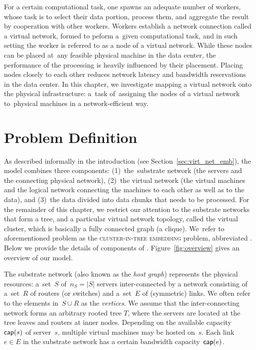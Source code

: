 
For a certain computational task, one spawns an adequate number of workers, whose task is to select their data portion, process them, and aggregate the result by cooperation with other workers.
Workers establish a network connection called a virtual network, formed to peform a~given computational task, and in such setting the worker is referred to as a node of a virtual network.
While these nodes can be placed at~any feasible physical machine in the data center, the performance of the processing is heavily influenced by their placement.
Placing nodes closely to each other reduces network latency and bandwidth reservations in the data center.
In this chapter, we investigate mapping a virtual network onto the physical infrastructure: a~task of~assigning the nodes of a virtual network to~physical machines in a network-efficient way.

\section{Problem Definition}\label{sec:model}

As described informally in the introduction (see Section~\ref{sec:virt_net_emb}), the model combines three components: (1)~the~substrate network (the servers
and the connecting physical network),
(2)~the virtual network (the virtual machines and the logical network connecting the machines to each other
as well as to the data), and (3)~the data divided into data chunks that needs to be processed.
For the remainder of this chapter, we restrict our attention to the substrate networks that form a tree, and a particular virtual network topology, called the virtual cluster, which is basically a fully connected graph (a clique).
We~refer to aforementioned problem as the \textsc{cluster-in-tree embedding} problem, abbreviated \CTE.
Below we provide the details of components of \CTE. Figure~\ref{fig:overview} gives an overview of our model.


 The substrate network (also known as the \emph{host graph}) represents the physical resources:
a~set~$S$ of~$n_S=|S|$ servers inter-connected by a network consisting of a~set~$R$ of routers (or switches)
and a~set~$E$ of (symmetric) links. We often refer to the elements in~$S\cup R$
as the \emph{vertices}. We assume that the inter-connecting network forms an arbitrary rooted tree $T$,
where the servers are located at the tree leaves and routers at inner nodes.
Depending on the available capacity~$\textsf{cap}(s)$ of server~$s$, multiple virtual machines may be hosted on~$s$.
Each link~$e\in E$ in the substrate network has a certain bandwidth capacity~$\textsf{cap}(e)$.

